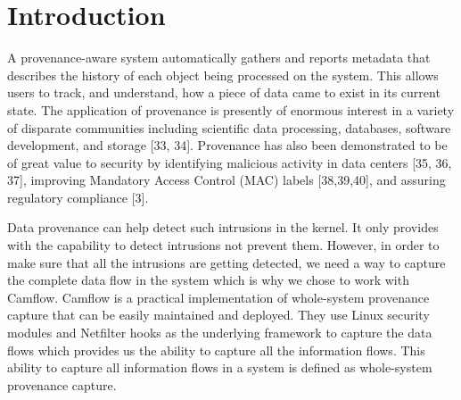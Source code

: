 \section{Introduction}



\label{What is provenance im general and with respect to computing?}

A provenance-aware system automatically gathers and
reports metadata that describes the history of each object being processed on the system. This allows users to
track, and understand, how a piece of data came to exist in its current state. The application of provenance
is presently of enormous interest in a variety of disparate communities including scientific data processing,
databases, software development, and storage [33, 34].
Provenance has also been demonstrated to be of great
value to security by identifying malicious activity in data
centers [35, 36, 37], improving Mandatory Access
Control (MAC) labels [38,39,40], and assuring regulatory compliance [3].
\vskip 0.1in



Data provenance can help detect such intrusions in the kernel. It only provides with the capability to detect intrusions not prevent them. However, in order to make sure that all the intrusions are getting detected, we need a way to capture the complete data flow in the system which is why we chose to work with Camflow. Camflow is a practical implementation of whole-system provenance capture that can be easily maintained and deployed. They use Linux security modules and Netfilter hooks as the underlying framework to capture the data flows which provides us the ability to capture all the information flows. This ability to capture all information flows in a system is defined as whole-system provenance capture. 
\vskip 0.1in

